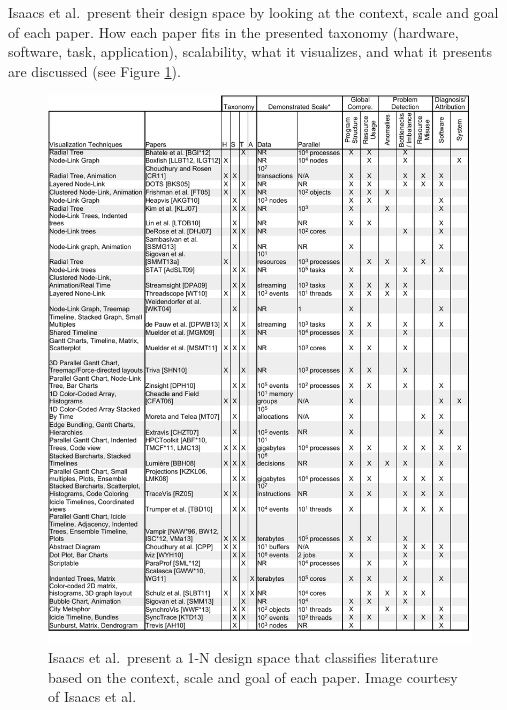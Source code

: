 Isaacs et al.\ present their design space by looking at the context, scale and goal of each paper. How each paper fits in the presented taxonomy (hardware, software, task, application), scalability, what it visualizes, and what it presents are discussed (see Figure \ref{fig: isaacs2014state}).

\begin{figure}[p]
\begin{center}
\includegraphics[width=1\textwidth]{images/isaacs2014stateFull}
\caption{Isaacs et al.\ present a 1-N design space that classifies literature based on the context, scale and goal of each paper. Image courtesy of Isaacs et al.\ \cite{isaacs2014state}} \label{fig: isaacs2014state}
\end{center}
\end{figure}

